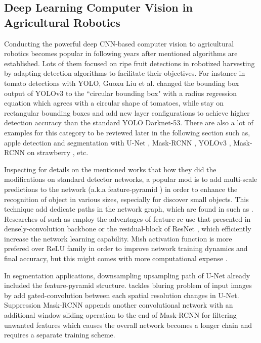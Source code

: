 \documentclass[default,pdflatex,iicol]{sn-jnl}%
\begin{document}
\subsection{Deep Learning Computer Vision in Agricultural Robotics}
Conducting the powerful deep CNN-based computer vision to agricultural robotics becomes popular in following years after mentioned algorithms are established. Lots of them focused on ripe fruit detections in robotized harvesting by adapting detection algorithms to facilitate their objectives. For instance in tomato detections with YOLO, Guoxu Liu et al. \cite{s20072145} changed the bounding box output of YOLOv3 to the ``circular bounding box" with a radius regression equation which agrees with a circular shape of tomatoes, while \cite{Lawal_2021, chentomato} stay on rectangular bounding boxes and add new layer configurations to achieve higher detection accuracy than the standard YOLO Darknet-53. There are also a lot of examples for this category to be reviewed later in the following section such as, apple detection and segmentation with U-Net \cite{Li2021apple}, Mask-RCNN \cite{Chu2021apple, Jia2020apple}, YOLOv3 \cite{Kuznetsova2020apple}, Mask-RCNN on strawberry \cite{Yu2019strawberry}, etc.

Inspecting for details on the mentioned works that how they did the modifications on standard detector networks, a popular mod is to add multi-scale predictions to the network (a.k.a feature-pyramid \cite{Tong2020}) in order to enhance the recognition of object in various sizes, especially for discover small objects. This technique add dedicate paths in the network graph, which are found in such as \cite{chentomato, Lawal_2021, Yu2019strawberry, Li2021apple}. Researches of such as \cite{Jia2020apple, Chu2021apple, Yu2019strawberry, Lawal2021tomato} employ the adventages of feature re-use that presented in densely-convolution backbone \cite{densenet} or the residual-block of ResNet \cite{resnet}, which efficiently increase the network learning capability. Mish activation function is more prefered over ReLU family in order to improve network training dynamics and final accuracy, but this might comes with more computational expense \cite{misra2019mish}.

In segmentation applications, downsampling upsampling path of U-Net already included the feature-pyramid structure. \cite{Li2021apple} tackles bluring problem of input images by add gated-convolution between each spatial resolution changes in U-Net. Suppression Mask-RCNN \cite{Chu2021apple} appends another convolutional network with an additional window sliding operation to the end of Mask-RCNN for filtering unwanted features which causes the overall network becomes a longer chain and requires a separate training scheme.
\end{document}
